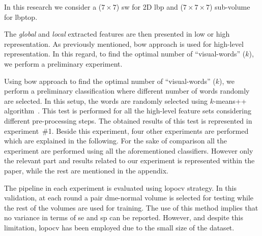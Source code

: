 {\color{red} In this research we consider a ($7 \times 7$) \acf{sw} for 2D \ac{lbp} and ($ 7 \times 7 \times 7$)  sub-volume for \ac{lbptop}.}
%

The \emph{global} and \emph{local} extracted features are then presented in low or high representation.
As previously mentioned, \ac{bow} approach is used for high-level representation.
In this regard, to find the optimal number of ``visual-words'' ($k$), we perform a preliminary experiment. 

Using \ac{bow} approach to find the optimal number of ``visual-words'' ($k$), we perform a preliminary classification where different number of words randomly are selected.
In this setup, the words are randomly selected using $k$-means++ algorithm~\cite{arthur2007k}.
This test is performed for all the high-level feature sets considering different pre-processing steps.
The obtained results of this test is represented in experiment~\#1.
Beside this experiment, four other experiments are performed which are explained in the following.
For the sake of comparison all the experiment are performed using all the aforementioned classifiers.
However only the relevant part and results related to our experiment is represented within the paper, while the rest are mentioned in the appendix.

The pipeline in each experiment is evaluated using \ac{lopocv} strategy.
In this validation, at each round a pair \ac{dme}-normal volume is selected for testing while the rest of the volumes are used for training.
The use of this method implies that no variance in terms of \ac{se} and \ac{sp} can be reported.
However, and despite this limitation, \ac{lopocv} has been employed due to the small size of the dataset.

